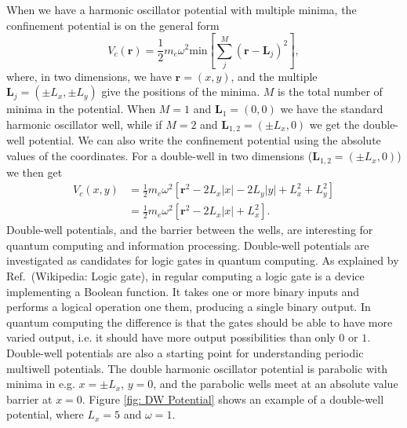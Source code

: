 \documentclass[../main.tex]{subfiles}
\begin{document}
When we have a harmonic oscillator potential with multiple minima, the confinement potential is on the general form
\begin{equation}
    V_c(\mathbf{r}) = \frac{1}{2} m_e \omega^2 \textrm{min}\left[\sum_j^M (\mathbf{r}-\mathbf{L}_j)^2\right],
\end{equation}
where, in two dimensions, we have $\mathbf{r} = (x,y)$, and the multiple $\mathbf{L}_j = (\pm L_x, \pm L_y)$ give the positions of the minima. $M$ is the total number of minima in the potential. When $M=1$ and $\mathbf{L}_1 = (0,0)$ we have the standard harmonic oscillator well, while if $M=2$ and $\mathbf{L}_{1,2} = (\pm L_x, 0)$ we get the double-well potential. We can also write the confinement potential using the absolute values of the coordinates. For a double-well in two dimensions ($\mathbf{L}_{1,2} = (\pm L_x, 0)$) we then get
\begin{equation}\label{eq: DW Potential}
\begin{split}
    V_c(x,y) &= \frac{1}{2} m_e \omega^2[\mathbf{r}^2 - 2L_x|x| - 2L_y|y| + L_x^2 + L_y^2]\\
    &= \frac{1}{2} m_e \omega^2[\mathbf{r}^2 - 2L_x|x| + L_x^2].
\end{split}
\end{equation}
Double-well potentials, and the barrier between the wells, are interesting for quantum computing and information processing. Double-well potentials are investigated as candidates for logic gates in quantum computing. As explained by Ref.~\cite{}(Wikipedia: Logic gate), in regular computing a logic gate is a device implementing a Boolean function. It takes one or more binary inputs and performs a logical operation one them, producing a single binary output. In quantum computing the difference is that the gates should be able to have more varied output, i.e. it should have more output possibilities than only $0$ or $1$. Double-well potentials are also a starting point for understanding periodic multiwell potentials. The double harmonic oscillator potential is parabolic with minima in e.g. $x = \pm L_x$, $y = 0$, and the parabolic wells meet at an absolute value barrier at $x=0$. Figure \ref{fig: DW Potential} shows an example of a double-well potential, where $L_x = 5$ and $\omega = 1$.
\end{document}

